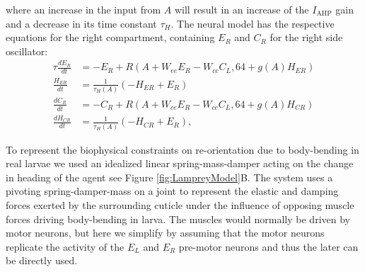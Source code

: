 \documentclass[11pt,a4paper]{article}
\begin{document}
where an increase in the input from $A$ will result in an increase of the $I_{\text{AHP}}$ gain and a decrease in its time constant $\tau_H$.
 The neural model has the respective equations for the right compartment, containing  $E_R$ and $C_R$ for the right side oscillator:
\begin{align}
\tau \frac{dE_R}{dt} & = - E_R +  R( A + W_{ee} E_R - W_{cc}C_L, 64 + g(A)H_{ER})\\
\frac{H_{ER}}{dt} &= \frac{1}{\tau_H(A)}(-H_{ER}+E_R)\\
\frac{dC_R}{dt} &= -C_R + R( A + W_{ce}E_R - W_{cc}C_L, 64+g(A)H_{CR})\\
\frac{dH_{CR}}{dt} &= \frac{1}{\tau_H(A)}(-H_{CR}+E_R),
\end{align}

To represent the biophysical constraints on re-orientation due to body-bending in real larvae we  used an idealized linear spring-mass-damper acting on the change in heading of the agent see Figure \ref{fig:LampreyModel}B.
The system uses a pivoting spring-damper-mass on a joint to represent the elastic and damping forces exerted by the surrounding cuticle under the influence of opposing muscle forces driving body-bending in larva.
 The muscles would normally be driven by motor neurons, but here we simplify by assuming that the motor neurons replicate the activity of the $E_L$ and $E_R$ pre-motor neurons and thus the later can be directly used.
\end{document}
